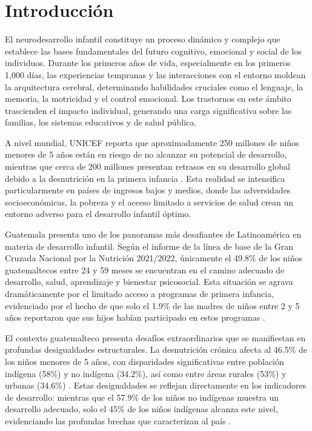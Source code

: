 \chapter{Introducción}
El neurodesarrollo infantil constituye un proceso dinámico y complejo que 
establece las bases fundamentales del futuro cognitivo, emocional y social de 
los individuos. Durante los primeros años de vida, especialmente en los primeros
1,000 días, las experiencias tempranas y las interacciones con el entorno
moldean la arquitectura cerebral, determinando habilidades cruciales como el
lenguaje, la memoria, la motricidad y el control emocional. Los trastornos en
este ámbito trascienden el impacto individual, generando una carga significativa
sobre las familias, los sistemas educativos y de salud pública.

A nivel mundial, UNICEF reporta que aproximadamente 250 millones de niños
menores de 5 años están en riesgo de no alcanzar su potencial de desarrollo,
mientras  que cerca de 200 millones presentan retrasos en su desarrollo global
debido a  la desnutrición en la primera infancia \cite{UNICEF2023}. Esta
realidad se  intensifica particularmente en países de ingresos bajos y medios,
donde las  adversidades socioeconómicas, la pobreza y el acceso limitado a
servicios de  salud crean un entorno adverso para el desarrollo infantil óptimo.

Guatemala presenta uno de los panoramas más desafiantes de Latinoamérica en
materia de desarrollo infantil. Según el informe de la línea de base de la Gran
Cruzada Nacional por la Nutrición 2021/2022, únicamente el 49.8\% de los niños
guatemaltecos entre 24 y 59 meses se encuentran en el camino adecuado de
desarrollo, salud, aprendizaje y bienestar psicosocial. Esta situación se agrava
dramáticamente por el limitado acceso a programas de primera infancia,
evidenciado por el hecho de que solo el 1.9\% de las madres de niños entre 2 y 5
años reportaron que sus hijos habían participado en estos programas
\cite{SESAN2022}.

El contexto guatemalteco presenta desafíos extraordinarios que se manifiestan en
profundas desigualdades estructurales. La desnutrición crónica afecta al 46.5\%
de los niños menores de 5 años, con disparidades significativas entre población
indígena (58\%) y no indígena (34.2\%), así como entre áreas rurales (53\%) y
urbanas (34.6\%) \cite{EnMaternoInfantil}. Estas desigualdades se reflejan
directamente en los indicadores de desarrollo: mientras que el 57.9\% de los
niños no indígenas muestra un desarrollo adecuado, solo el 45\% de los niños
indígenas alcanza este nivel, evidenciando las profundas brechas que
caracterizan al país \cite{SESAN2022}.

